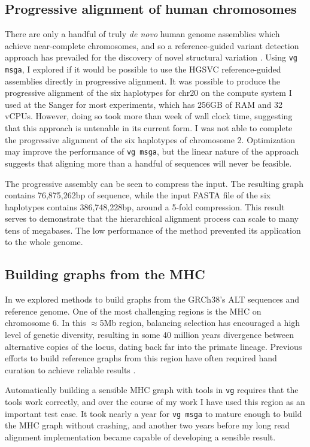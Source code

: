 \subsection{Progressive alignment of human chromosomes}

There are only a handful of truly \emph{de novo} human genome assemblies which achieve near-complete chromosomes, and so a reference-guided variant detection approach has prevailed for the discovery of novel structural variation \cite{fan2017hysa}.
Using {\tt vg msga}, I explored if it would be possible to use the HGSVC reference-guided assemblies directly in progressive alignment.
It was possible to produce the progressive alignment of the six haplotypes for chr20 on the compute system I used at the Sanger for most experiments, which has 256GB of RAM and 32 vCPUs.
However, doing so took more than week of wall clock time, suggesting that this approach is untenable in its current form.
I was not able to complete the progressive alignment of the six haplotypes of chromosome 2.
Optimization may improve the performance of {\tt vg msga}, but the linear nature of the approach suggests that aligning more than a handful of sequences will never be feasible.

The progressive assembly can be seen to compress the input.
The resulting graph contains 76,875,262bp of sequence, while the input FASTA file of the six haplotypes contains 386,748,228bp, around a 5-fold compression.
This result serves to demonstrate that the hierarchical alignment process can scale to many tens of megabases.
The low performance of the method prevented its application to the whole genome.

\subsection{Building graphs from the MHC}

In \cite{novak2017genome} we explored methods to build graphs from the GRCh38's ALT sequences and reference genome.
One of the most challenging regions is the MHC on chromosome 6.
In this $\approx$5Mb region, balancing selection has encouraged a high level of genetic diversity, resulting in some 40 million years divergence between alternative copies of the locus, dating back far into the primate lineage.
Previous efforts to build reference graphs from this region have often required hand curation to achieve reliable results \cite{dilthey2015improved}.

Automatically building a sensible MHC graph with tools in {\tt vg} requires that the tools work correctly, and over the course of my work I have used this region as an important test case.
It took nearly a year for {\tt vg msga} to mature enough to build the MHC graph without crashing, and another two years before my long read alignment implementation became capable of developing a sensible result.

